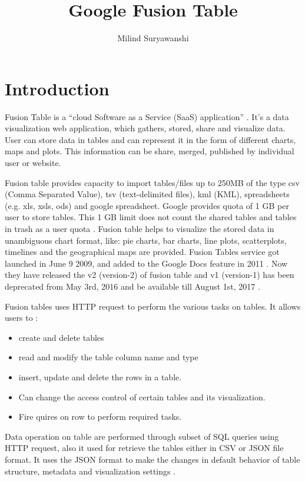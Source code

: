 \documentclass[9pt,twocolumn,twoside]{../../styles/osajnl}
\title{Google Fusion Table}
\author[1,2]{Milind Suryawanshi}
\affil[1]{School of Informatics and Computing, Bloomington, IN 47408, U.S.A.}
\affil[2]{Electronics and Telecommunication Engineer,Pune University, 2010}
\affil[*]{Corresponding authors: laszewski@gmail.com}
\begin{document}
\maketitle

\section{Introduction}

Fusion Table is a “cloud Software as a Service (SaaS) application” \cite{www-1}. It’s a data visualization web application, which gathers, stored, share and visualize data. User can store data in tables and can represent it in the form of different charts, maps and plots. This information can be share, merged, published by individual user or website.  

 
Fusion table provides capacity to import tables/files up to 250MB \cite{www-2} of the type csv (Comma Separated Value), tsv (text-delimited files), kml (KML), spreadsheets (e.g. xls, xsls, ods) and google spreadsheet. Google provides quota of 1 GB per user to store tables. This 1 GB limit does not count the shared tables and tables in trash as a user quota \cite{www-2}. Fusion table helps to visualize the stored data in unambiguous chart format, like: pie charts, bar charts, line plots, scatterplots, timelines and the geographical maps are provided. Fusion Tables service got launched in June 9 2009, and added to the Google Docs feature in 2011 \cite{www-3}. Now they have released the v2 (version-2) of fusion table and v1 (version-1) has been deprecated from May 3rd, 2016 and be available till August 1st, 2017 \cite{www-4}.


Fusion tables uses HTTP request to perform the various tasks on tables. It allows users to \cite{www-5}:

\begin{itemize}
	\item create and delete tables
	\item read and modify the table column name and type
	\item insert, update and delete the rows in a table.
	\item Can change the access control of certain tables and its visualization.
	\item Fire quires on row to perform required tasks.
\end{itemize}

Data operation on table are performed through subset of SQL queries using HTTP request, also it used for retrieve the tables either in CSV or JSON file format. It uses the JSON format to make the changes in default behavior of table structure, metadata and visualization settings \cite{www-5}. 
\end{document}
